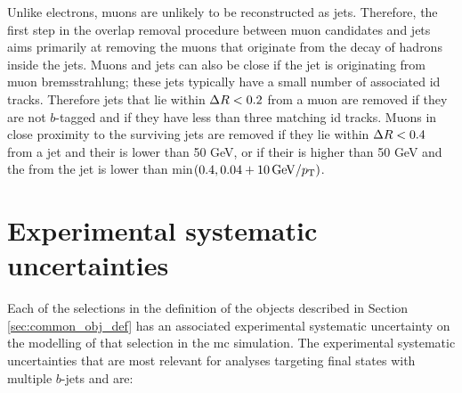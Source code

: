 Unlike electrons, muons are unlikely to be reconstructed as jets. Therefore, the first step in the overlap removal procedure between muon candidates and jets 
aims primarily at removing the muons that originate from the decay of hadrons inside the jets. 
Muons and jets can also be close if the jet is originating from muon bremsstrahlung; these jets typically have a small number of associated \gls{id} tracks.
Therefore jets that lie within $\Delta R < 0.2$ from a muon are removed if they are not $b$-tagged and if they have less than three matching \gls{id} tracks. 
Muons in close proximity to the surviving jets are removed 
if they lie within $\Delta R<0.4$ from a jet and their \pt is lower than 50 GeV, or if their \pt is higher than 50 GeV and the \dR from the jet 
is lower than min$(0.4, 0.04 + 10 \, {\rm{GeV}}/p_{\rm T})$. 

\section{Experimental systematic uncertainties}
\label{sec:common_syst}

Each of the selections in the definition of the objects described in Section \ref{sec:common_obj_def} has an associated experimental systematic uncertainty on the modelling of that selection in 
the \gls{mc} simulation. The experimental systematic uncertainties that are most relevant for analyses targeting final states with multiple $b$-jets and \met are:

